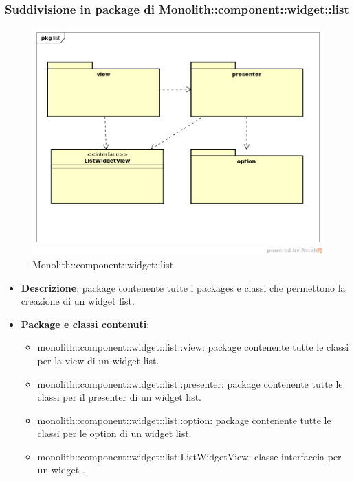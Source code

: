 \subsubsection{Suddivisione in package  di Monolith::component::widget::list}
\label{Monolith::component::widget::list}
\begin{figure}[H]
	\centering
	\includegraphics[scale=0.5]{Sezioni/imgPackage/component_widget_list.png}
	\caption{Monolith::component::widget::list}
\end{figure}
\begin{itemize}
	\item{\textbf{Descrizione}}: package contenente tutte i packages e classi che permettono la creazione di un widget list.
	\item{\textbf{Package e classi contenuti}}:
	\begin{itemize}
	\item{monolith::component::widget::list::view}: package contenente tutte le classi per la view di un widget list.
	\item{monolith::component::widget::list::presenter}: package contenente tutte le classi per il presenter di un widget list.
	\item{monolith::component::widget::list::option}: package contenente tutte le classi per le option di un widget list.
	\item{monolith::component::widget::list:ListWidgetView}: classe interfaccia per un widget .
	\end{itemize}
	
\end{itemize}



